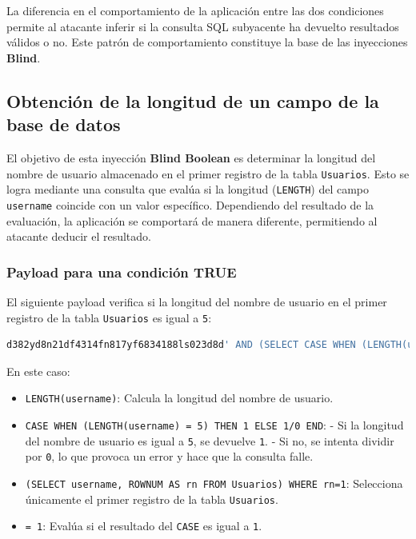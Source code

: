 \documentclass[a4paper,12pt]{article}
\begin{document}
La diferencia en el comportamiento de la aplicación entre las dos condiciones permite al atacante inferir si la consulta SQL subyacente ha devuelto resultados válidos o no. Este patrón de comportamiento constituye la base de las inyecciones \textbf{Blind}.

\subsection{Obtención de la longitud de un campo de la base de datos}

El objetivo de esta inyección \textbf{Blind Boolean} es determinar la longitud del nombre de usuario almacenado en el primer registro de la tabla \texttt{Usuarios}. Esto se logra mediante una consulta que evalúa si la longitud (\texttt{LENGTH}) del campo \texttt{username} coincide con un valor específico. Dependiendo del resultado de la evaluación, la aplicación se comportará de manera diferente, permitiendo al atacante deducir el resultado.

\subsubsection{Payload para una condición TRUE}

El siguiente payload verifica si la longitud del nombre de usuario en el primer registro de la tabla \texttt{Usuarios} es igual a \texttt{5}:

\begin{lstlisting}[language=SQL]
d382yd8n21df4314fn817yf6834188ls023d8d' AND (SELECT CASE WHEN (LENGTH(username) = 5) THEN 1 ELSE 1/0 END FROM (SELECT username, ROWNUM AS rn FROM Usuarios) WHERE rn=1) = 1 --
\end{lstlisting}

En este caso:
\begin{itemize}
    \item \texttt{LENGTH(username)}: Calcula la longitud del nombre de usuario.
    \item \texttt{CASE WHEN (LENGTH(username) = 5) THEN 1 ELSE 1/0 END}: 
    - Si la longitud del nombre de usuario es igual a \texttt{5}, se devuelve \texttt{1}.
    - Si no, se intenta dividir por \texttt{0}, lo que provoca un error y hace que la consulta falle.
    \item \texttt{(SELECT username, ROWNUM AS rn FROM Usuarios) WHERE rn=1}: Selecciona únicamente el primer registro de la tabla \texttt{Usuarios}.
    \item \texttt{= 1}: Evalúa si el resultado del \texttt{CASE} es igual a \texttt{1}.
\end{itemize}
\end{document}
